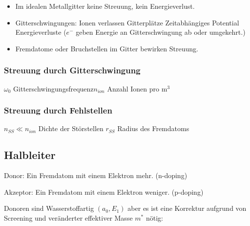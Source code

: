 \documentclass[10pt,a4paper]{scrartcl}
\begin{document}
\begin{multicols*}{3}
	\small
	\normalsize

	\begin{itemize}
	\compaq
	\item
	Im idealen Metallgitter keine Streuung, kein Energieverlust.
	\item
	Gitterschwingungen: Ionen verlassen Gitterplätze \dahe Zeitabhängiges Potential \dahe Energieverluste ($e^-$ geben Energie an Gitterschwingung ab oder umgekehrt.)
	\item
	Fremdatome oder Bruchstellen im Gitter bewirken Streuung.
	\end{itemize}
	
	
	\subsubsection{Streuung durch Gitterschwingung}
	
	
	\footnotesize
	$\omega_0$ Gitterschwingungsfrequenz\hfill $n_{ion}$ Anzahl Ionen pro $\si{\meter\cubed}$
	\normalsize
	
	\subsubsection{Streuung durch Fehlstellen}
	
	
	\footnotesize
	$n_{SS}\ll n_{ion}$ Dichte der Störstellen \hfill $r_{SS}$ Radius des Fremdatoms
	\normalsize
	
	\subsection{Halbleiter}
	
	
	Donor: Ein Fremdatom mit einem Elektron mehr. (n-doping)
	
	Akzeptor: Ein Fremdatom mit einem Elektron weniger. (p-doping)
	
	
	Donoren sind Wasserstoffartig $(a_0,E_1)$ aber es ist eine Korrektur aufgrund von Screening und veränderter effektiver Masse $m^\ast$ nötig:
	

\end{multicols*}
\end{document}
